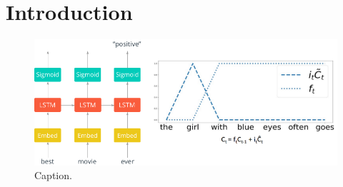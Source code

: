 \section{Introduction}
\lipsum[1-6]

\begin{figure}
\includegraphics[width=\linewidth]{Figures/Figure1_intro.png}
\caption{Caption.}
\end{figure}
